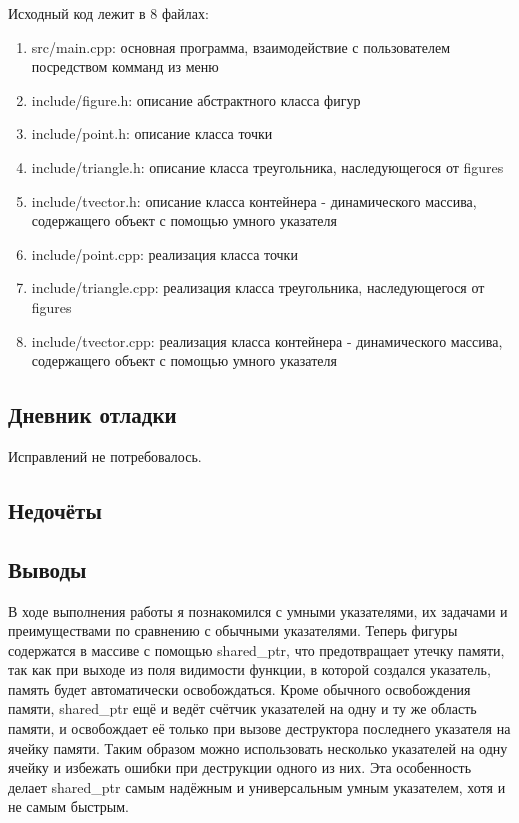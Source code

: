 \documentclass[12pt]{article}
\begin{document}
Исходный код лежит в 8 файлах:
\begin{enumerate}
\item src/main.cpp: основная программа, взаимодействие с пользователем посредством комманд из меню

\item include/figure.h:    описание абстрактного класса фигур

\item include/point.h:     описание класса точки
\item include/triangle.h:  описание класса треугольника, наследующегося от figures
\item include/tvector.h:     описание класса контейнера - динамического массива, содержащего объект с помощью умного указателя

\item include/point.cpp:     реализация класса точки
\item include/triangle.cpp:  реализация класса треугольника, наследующегося от figures
\item include/tvector.cpp: реализация класса контейнера - динамического массива, содержащего объект с помощью умного указателя

\end{enumerate}

\subsection*{Дневник отладки}
Исправлений не потребовалось.


\subsection*{Недочёты}


\subsection*{Выводы}
В ходе выполнения работы я познакомился с умными указателями, их задачами и преимуществами по сравнению с обычными указателями. Теперь фигуры содержатся в массиве с помощью shared\_ptr, что предотвращает утечку памяти, так как при выходе из поля видимости функции, в которой создался указатель, память будет автоматически освобождаться. Кроме обычного освобождения памяти, shared\_ptr ещё и ведёт счётчик указателей на одну и ту же область памяти, и освобождает её только при вызове деструктора последнего указателя на ячейку памяти. Таким образом можно использовать несколько указателей на одну ячейку и избежать ошибки при деструкции одного из них. Эта особенность делает shared\_ptr самым надёжным и универсальным умным указателем, хотя и не самым быстрым.
\end{document}
